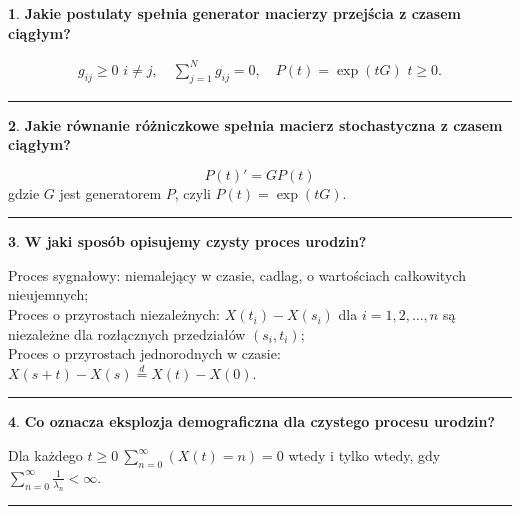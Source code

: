 \documentclass[
    twocolumn,
    twoside,
    fontsize=11pt,
    paper=A0,
    DIV=30
]{scrartcl}
\theoremstyle{definition}
\newtheorem{pytanie}{}
\theoremstyle{break}
\newenvironment{odpowiedź}{\vspace{-0.7em}}{\vspace{0.3em}\hrule}
\begin{document}
\begin{pytanie}
\textbf{Jakie postulaty spełnia generator macierzy przejścia z czasem ciągłym?}
\end{pytanie}
\begin{odpowiedź}
    \begin{gather}
        g_{ij} \geq 0 \,\, i \neq j, \quad
        \sum_{j=1}^N g_{ij} = 0, \quad
        P(t)=\exp(tG) \,\, t\geq 0.
    \end{gather}
\end{odpowiedź}


\begin{pytanie}
\textbf{Jakie równanie różniczkowe spełnia macierz stochastyczna z czasem ciągłym?}
\end{pytanie}
\begin{odpowiedź}
    \begin{equation}
        P(t)' = GP(t)
    \end{equation}
    gdzie $G$ jest generatorem $P$, czyli $P(t)=\exp(tG)$.
\end{odpowiedź}


\begin{pytanie}
\textbf{W jaki sposób opisujemy czysty proces urodzin?}
\end{pytanie}
\begin{odpowiedź}
    Proces sygnałowy: niemalejący w czasie,
        cadlag, o wartościach całkowitych nieujemnych; \\
    Proces o przyrostach niezależnych:
        $X(t_i)-X(s_i)$ dla $i=1,2,\ldots,n$
        są niezależne dla rozłącznych przedziałów $(s_i,t_i)$; \\
    Proces o przyrostach jednorodnych w czasie:
        $X(s+t)-X(s)\overset d = X(t)-X(0)$.
\end{odpowiedź}


\begin{pytanie}
\textbf{Co oznacza eksplozja demograficzna dla czystego procesu urodzin?}
\end{pytanie}
\begin{odpowiedź}
    Dla każdego $t \geq 0 \ \sum\limits_{n=0}^\infty (X(t)=n)=0$ wtedy i tylko wtedy, gdy $\sum\limits_{n=0}^\infty \frac{1}{\lambda_n} < \infty$.
\end{odpowiedź}
\end{document}
